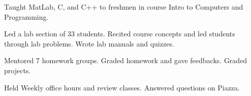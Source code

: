 \SJTU
{}

Taught MatLab, C, and C++ to freshmen in course Intro to Computers and Programming.

\begin{miniItemize}
    \item Led a lab section of 33 students. Recited course concepts and led students through lab problems. Wrote lab manuals and quizzes.
    \item Mentored 7 homework groups. Graded homework and gave feedbacks. Graded projects.
    \item Held Weekly office hours and review classes. Answered questions on Piazza.
\end{miniItemize}
